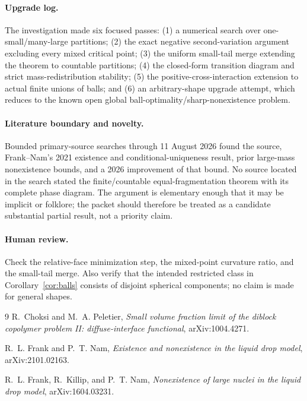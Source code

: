 \documentclass[11pt]{article}
\begin{document}
\paragraph{Upgrade log.}
The investigation made six focused passes: (1) a numerical search over
one-small/many-large partitions; (2) the exact negative second-variation
argument excluding every mixed critical point; (3) the uniform small-tail
merge extending the theorem to countable partitions; (4) the closed-form
transition diagram and strict mass-redistribution stability; (5) the
positive-cross-interaction extension to actual finite unions of balls; and
(6) an arbitrary-shape upgrade attempt, which reduces to the known open
global ball-optimality/sharp-nonexistence problem.

\paragraph{Literature boundary and novelty.}
Bounded primary-source searches through 11 August 2026 found the source,
Frank--Nam's 2021 existence and conditional-uniqueness result, prior
large-mass nonexistence bounds, and a 2026 improvement of that bound.  No
source located in the search stated the finite/countable equal-fragmentation
theorem with its complete phase diagram.  The argument is elementary enough
that it may be implicit or folklore; the packet should therefore be treated
as a candidate substantial partial result, not a priority claim.

\paragraph{Human review.}
Check the relative-face minimization step, the mixed-point curvature ratio,
and the small-tail merge.  Also verify that the intended restricted class in
Corollary~\ref{cor:balls} consists of disjoint spherical components; no claim
is made for general shapes.

\begin{thebibliography}{9}
R.~Choksi and M.~A. Peletier,
\emph{Small volume fraction limit of the diblock copolymer problem II:
diffuse-interface functional}, arXiv:1004.4271.

R.~L. Frank and P.~T. Nam,
\emph{Existence and nonexistence in the liquid drop model},
arXiv:2101.02163.

R.~L. Frank, R.~Killip, and P.~T. Nam,
\emph{Nonexistence of large nuclei in the liquid drop model},
arXiv:1604.03231.
\end{thebibliography}
\end{document}
